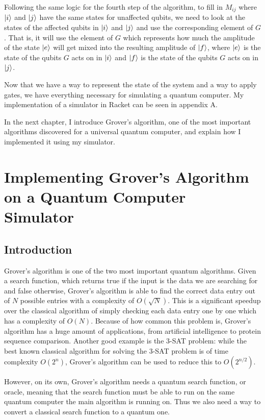 \documentclass[11pt]{report}
\newcommand{\?}{\stackrel{?}{=}}
\begin{document}
Following the same logic for the fourth step of the algorithm, to fill in $M_{ij}$ where $\ket{i}$ and $\ket{j}$ have the same states for unaffected qubits, we need to look at the states of the affected qubits in $\ket{i}$ and $\ket{j}$ and use the corresponding element of $G$. That is, it will use the element of $G$ which represents how much the amplitude of the state $\ket{e}$ will get mixed into the resulting amplitude of $\ket{f}$, where $\ket{e}$ is the state of the qubits $G$ acts on in $\ket{i}$ and $\ket{f}$ is the state of the qubits $G$ acts on in $\ket{j}$.

Now that we have a way to represent the state of the system and a way to apply gates, we have everything necessary for simulating a quantum computer. My implementation of a simulator in Racket can be seen in appendix A.

In the next chapter, I introduce Grover's algorithm, one of the most important algorithms discovered for a universal quantum computer, and explain how I implemented it using my simulator.

\chapter{Implementing Grover's Algorithm on a Quantum Computer Simulator}

\section{Introduction}

Grover's algorithm is one of the two most important quantum algorithms. Given a search function, which returns true if the input is the data we are searching for and false otherwise, Grover's algorithm is able to find the correct data entry out of $N$ possible entries with a complexity of $O(\sqrt{N})$. This is a significant speedup over the classical algorithm of simply checking each data entry one by one which has a complexity of $O(N)$. Because of how common this problem is, Grover's algorithm has a huge amount of applications, from artificial intelligence to protein sequence comparison. Another good example is the 3-SAT problem: while the best known classical algorithm for solving the 3-SAT problem is of time complexity $O(2^{n})$, Grover's algorithm can be used to reduce this to $O(2^{n/2})$.

However, on its own, Grover's algorithm needs a quantum search function, or oracle, meaning that the search function must be able to run on the same quantum computer the main algorithm is running on. Thus we also need a way to convert a classical search function to a quantum one.
\end{document}
